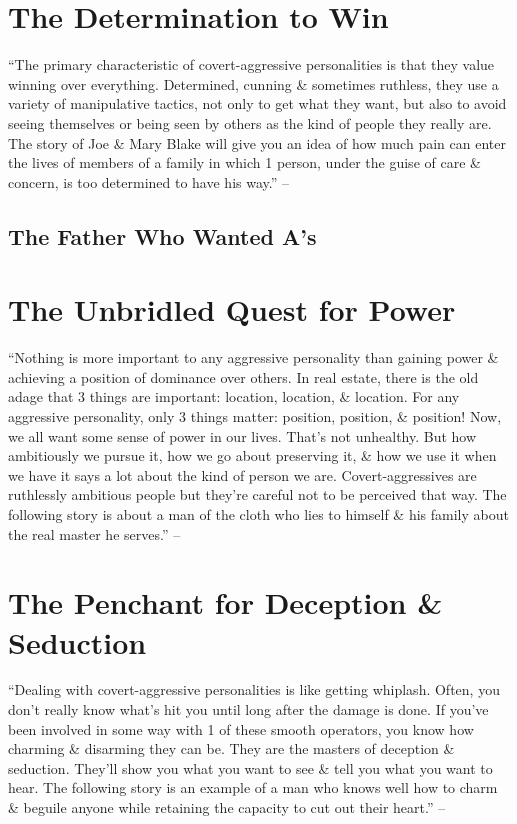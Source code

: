 \documentclass{article}
\numberwithin{equation}{section}
\begin{document}
\section{The Determination to Win}
``The primary characteristic of covert-aggressive personalities is that they value winning over everything. Determined, cunning \& sometimes ruthless, they use a variety of manipulative tactics, not only to get what they want, but also to avoid seeing themselves or being seen by others as the kind of people they really are. The story of Joe \& Mary Blake will give you an idea of how much pain can enter the lives of members of a family in which 1 person, under the guise of care \& concern, is too determined to have his way.'' -- \cite[p. 48]{Simon2010}

\subsection{The Father Who Wanted A's}


\section{The Unbridled Quest for Power}
``Nothing is more important to any aggressive personality than gaining power \& achieving a position of dominance over others. In real estate, there is the old adage that 3 things are important: location, location, \& location. For any aggressive personality, only 3 things matter: position, position, \& position! Now, we all want some sense of power in our lives. That's not unhealthy. But how ambitiously we pursue it, how we go about preserving it, \& how we use it when we have it says a lot about the kind of person we are. Covert-aggressives are ruthlessly ambitious people but they're careful not to be perceived that way. The following story is about a man of the cloth who lies to himself \& his family about the real master he serves.'' -- \cite[p. 54]{Simon2010}


\section{The Penchant for Deception \& Seduction}
``Dealing with covert-aggressive personalities is like getting whiplash. Often, you don't really know what's hit you until long after the damage is done. If you've been involved in some way with 1 of these smooth operators, you know how charming \& disarming they can be. They are the masters of deception \& seduction. They'll show you what you want to see \& tell you what you want to hear. The following story is an example of a man who knows well how to charm \& beguile anyone while retaining the capacity to cut out their heart.'' -- \cite[p. 59]{Simon2010}
\end{document}
